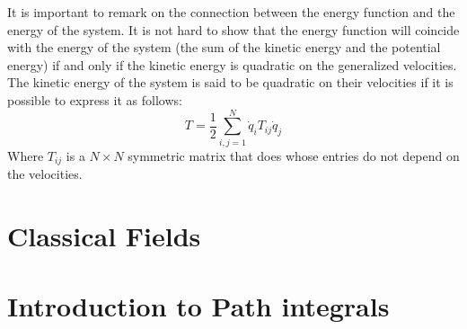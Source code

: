 \noindent It is important to remark on the connection between the energy function and the energy of the system. It is not hard to show that the energy function will coincide with the energy of the system (the sum of the kinetic energy and the potential energy) if and only if the kinetic energy is quadratic on the generalized velocities. The kinetic energy of the system is said to be quadratic on their velocities if it is possible to express it as follows: 
\begin{equation}
    T = \frac{1}{2}\sum_{i,j = 1}^N \dot q_i T_{ij} \dot q_j
\end{equation}
Where $T_{ij}$ is a $N\times N$ symmetric matrix that does whose entries do not depend on the velocities.
\section{Classical Fields}
\section{Introduction to Path integrals}
